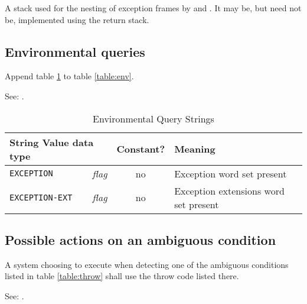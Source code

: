 A stack used for the nesting of exception frames by 
and . It may be, but need not be, implemented using
the return stack.

\subsection{Environmental queries} %

Append table \ref{exception:env} to table \ref{table:env}.

See: .

\begin{table}[ht]
  \begin{center}
	\caption{Environmental Query Strings}
	\label{exception:env}
	\begin{tabular}{p{9em}rcp{}}
		\hline\hline
		\multicolumn{2}{l}{String \hfill Value data type} & Constant? & Meaning \\
		\hline
		\texttt{EXCEPTION}		& \emph{flag}	& no	&
			Exception word set present \\
		\texttt{EXCEPTION-EXT}	& \emph{flag}	& no	&
			Exception extensions word set present \\
		\hline\hline
	\end{tabular}
  \end{center}
\end{table}

\subsection{Possible actions on an ambiguous condition} %
\label{exception:ambiguous}

A system choosing to execute  when detecting one of the
ambiguous conditions listed in table \ref{table:throw} shall use the
throw code listed there.

See: .


